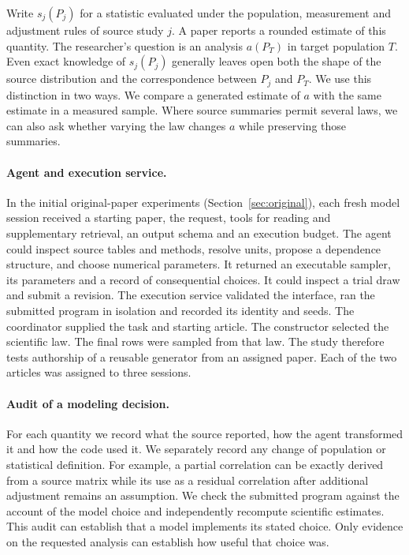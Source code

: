 \documentclass[sigconf,anonymous,review]{acmart}
\begin{document}
Write $s_j(P_j)$ for a statistic evaluated under the population, measurement and adjustment rules of source study $j$. A paper reports a rounded estimate of this quantity. The researcher's question is an analysis $a(P_T)$ in target population $T$. Even exact knowledge of $s_j(P_j)$ generally leaves open both the shape of the source distribution and the correspondence between $P_j$ and $P_T$. We use this distinction in two ways. We compare a generated estimate of $a$ with the same estimate in a measured sample. Where source summaries permit several laws, we can also ask whether varying the law changes $a$ while preserving those summaries.

\paragraph{Agent and execution service.}
In the initial original-paper experiments (Section~\ref{sec:original}), each fresh model session received a starting paper, the request, tools for reading and supplementary retrieval, an output schema and an execution budget. The agent could inspect source tables and methods, resolve units, propose a dependence structure, and choose numerical parameters. It returned an executable sampler, its parameters and a record of consequential choices. It could inspect a trial draw and submit a revision. The execution service validated the interface, ran the submitted program in isolation and recorded its identity and seeds. The coordinator supplied the task and starting article. The constructor selected the scientific law. The final rows were sampled from that law. The study therefore tests authorship of a reusable generator from an assigned paper. Each of the two articles was assigned to three sessions.

\paragraph{Audit of a modeling decision.}
For each quantity we record what the source reported, how the agent transformed it and how the code used it. We separately record any change of population or statistical definition. For example, a partial correlation can be exactly derived from a source matrix while its use as a residual correlation after additional adjustment remains an assumption. We check the submitted program against the account of the model choice and independently recompute scientific estimates. This audit can establish that a model implements its stated choice. Only evidence on the requested analysis can establish how useful that choice was.
\end{document}
